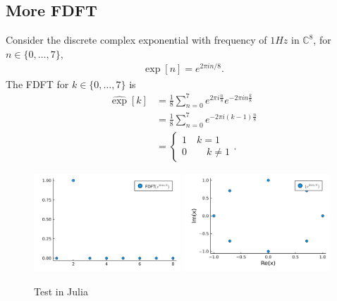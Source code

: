 \subsection{More FDFT}
Consider the discrete complex exponential with frequency of $1Hz$ in
$\mathbb{C}^8$, for $n \in \{0, \dots , 7\}$,
\begin{align}
    \exp[n] = e^{2\pi i n/8}.
\end{align}
The FDFT for $k \in \{0, \dots, 7\}$ is
\begin{align}
    \hat{\exp}[k] &= \frac{1}{8}\sum_{n=0}^7 e^{2\pi i \frac{n}{8}}e^{-2\pi i
    n \frac{k}{8}} \\
                  &= \frac{1}{8} \sum_{n=0}^7e^{-2\pi i (k-1)\frac{n}{8}}\\
                  &=
                  \begin{cases}
                      1\quad k=1\\
                      0 \qquad k\neq 1
                   \end{cases}.
\end{align}
\begin{figure}[H]
    \centering
    \includegraphics[width=0.49\textwidth]{./figures/fdft.png}
    \includegraphics[width=0.49\textwidth]{./figures/normal.png}
    \caption{Test in Julia}
\end{figure}
